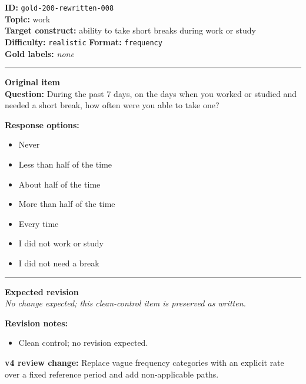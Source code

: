 \documentclass[10pt,a4paper]{article}
\newcommand{\sectionline}{\vspace{0.15em}\hrule\vspace{0.35em}}
\begin{document}
\begin{tcolorbox}[colframe=CleanGreen,colback=white,colbacktitle=CleanGreen!9,coltitle=black,title={Item 008\hfill Clean control}]
\textbf{ID:} \texttt{gold-200-rewritten-008}\\
\textbf{Topic:} work\\
\textbf{Target construct:} ability to take short breaks during work or study\\
\textbf{Difficulty:} \texttt{realistic} \quad \textbf{Format:} \texttt{frequency}\\
\textbf{Gold labels:} \textit{none}\\
\sectionline
\textbf{Original item}\\
\textbf{Question:} During the past 7 days, on the days when you worked or studied and needed a short break, how often were you able to take one?
\par\textbf{Response options:}
\begin{itemize}
\item Never
\item Less than half of the time
\item About half of the time
\item More than half of the time
\item Every time
\item I did not work or study
\item I did not need a break
\end{itemize}
\sectionline
\textbf{Expected revision}\\
\textit{No change expected; this clean-control item is preserved as written.}
\par\textbf{Revision notes:}
\begin{itemize}
\item Clean control; no revision expected.
\end{itemize}
\par\textbf{v4 review change:} Replace vague frequency categories with an explicit rate over a fixed reference period and add non-applicable paths.
\end{tcolorbox}
\end{document}
